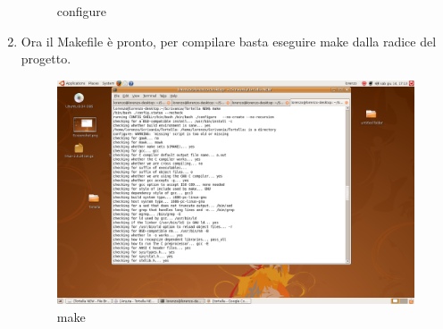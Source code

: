 \begin{enumerate}
\begin{figure}[H]
\begin{center}
\caption{configure}
\label{configure}
\end{center}
\end{figure}
\item Ora il Makefile è pronto, per compilare basta eseguire make dalla radice del progetto.
\begin{figure}[H]
\begin{center}
\includegraphics[scale=0.5]{etc/make}
\caption{make}
\label{make}
\end{center}
\end{figure}
\end{enumerate}
